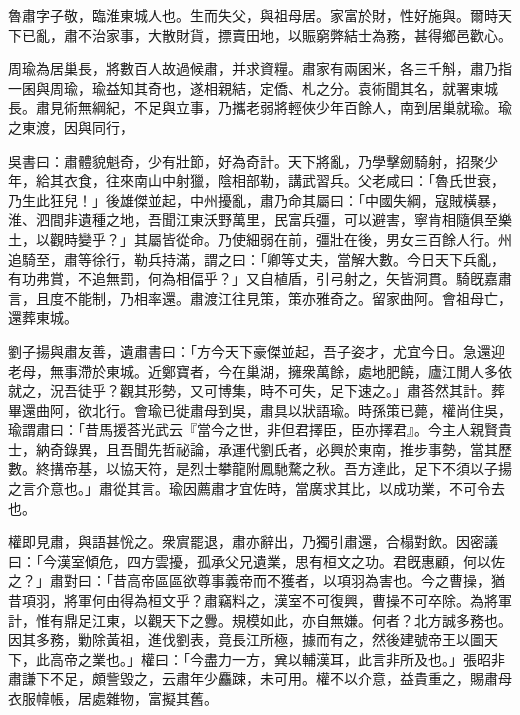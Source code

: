 
\begin{pinyinscope}
魯肅字子敬，臨淮東城人也。生而失父，與祖母居。家富於財，性好施與。爾時天下已亂，肅不治家事，大散財貨，摽賣田地，以賑窮弊結士為務，甚得鄉邑歡心。

周瑜為居巢長，將數百人故過候肅，并求資糧。肅家有兩囷米，各三千斛，肅乃指一囷與周瑜，瑜益知其奇也，遂相親結，定僑、札之分。袁術聞其名，就署東城長。肅見術無綱紀，不足與立事，乃攜老弱將輕俠少年百餘人，南到居巢就瑜。瑜之東渡，因與同行，

吳書曰：肅體貌魁奇，少有壯節，好為奇計。天下將亂，乃學擊劒騎射，招聚少年，給其衣食，往來南山中射獵，陰相部勒，講武習兵。父老咸曰：「魯氏世衰，乃生此狂兒！」後雄傑並起，中州擾亂，肅乃命其屬曰：「中國失綱，寇賊橫暴，淮、泗間非遺種之地，吾聞江東沃野萬里，民富兵彊，可以避害，寧肯相隨俱至樂土，以觀時變乎？」其屬皆從命。乃使細弱在前，彊壯在後，男女三百餘人行。州追騎至，肅等徐行，勒兵持滿，謂之曰：「卿等丈夫，當解大數。今日天下兵亂，有功弗賞，不追無罰，何為相偪乎？」又自植盾，引弓射之，矢皆洞貫。騎旣嘉肅言，且度不能制，乃相率還。肅渡江往見策，策亦雅奇之。留家曲阿。會祖母亡，還葬東城。

劉子揚與肅友善，遺肅書曰：「方今天下豪傑並起，吾子姿才，尤宜今日。急還迎老母，無事滯於東城。近鄭寶者，今在巢湖，擁衆萬餘，處地肥饒，廬江閒人多依就之，況吾徒乎？觀其形勢，又可博集，時不可失，足下速之。」肅荅然其計。葬畢還曲阿，欲北行。會瑜已徙肅母到吳，肅具以狀語瑜。時孫策已薨，權尚住吳，瑜謂肅曰：「昔馬援荅光武云『當今之世，非但君擇臣，臣亦擇君』。今主人親賢貴士，納奇錄異，且吾聞先哲祕論，承運代劉氏者，必興於東南，推步事勢，當其歷數。終搆帝基，以協天符，是烈士攀龍附鳳馳騖之秋。吾方達此，足下不須以子揚之言介意也。」肅從其言。瑜因薦肅才宜佐時，當廣求其比，以成功業，不可令去也。

權即見肅，與語甚恱之。衆賔罷退，肅亦辭出，乃獨引肅還，合榻對飲。因密議曰：「今漢室傾危，四方雲擾，孤承父兄遺業，思有桓文之功。君旣惠顧，何以佐之？」肅對曰：「昔高帝區區欲尊事義帝而不獲者，以項羽為害也。今之曹操，猶昔項羽，將軍何由得為桓文乎？肅竊料之，漢室不可復興，曹操不可卒除。為將軍計，惟有鼎足江東，以觀天下之釁。規模如此，亦自無嫌。何者？北方誠多務也。因其多務，勦除黃祖，進伐劉表，竟長江所極，據而有之，然後建號帝王以圖天下，此高帝之業也。」權曰：「今盡力一方，兾以輔漢耳，此言非所及也。」張昭非肅謙下不足，頗訾毀之，云肅年少麤踈，未可用。權不以介意，益貴重之，賜肅母衣服幃帳，居處雜物，富擬其舊。


\end{pinyinscope}
